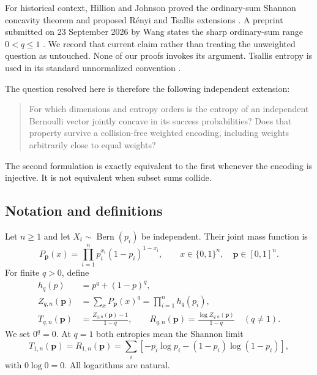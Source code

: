 \documentclass[11pt]{article}
\numberwithin{equation}{section}
\theoremstyle{definition}
\theoremstyle{remark}
\newcommand{\Bern}{\operatorname{Bern}}
\newcommand{\p}{\boldsymbol p}
\newcommand{\Tq}{T_{q,n}}
\newcommand{\Rq}{R_{q,n}}
\newcommand{\Zq}{Z_{q,n}}
\begin{document}
For historical context, Hillion and Johnson proved the ordinary-sum
Shannon concavity theorem and proposed R\'enyi and Tsallis extensions
\cite{HJ2017}. A preprint submitted on 23 September 2026 by Wang states the
sharp ordinary-sum range $0<q\leq1$ \cite{bep:pe:Wang}. We record that current
claim rather than treating the unweighted question as untouched. None of
our proofs invokes its argument. Tsallis entropy is used in its standard
unnormalized convention \cite{bep:pe:Tsallis}.


The question resolved here is therefore the following independent
extension:
\begin{quote}
For which dimensions and entropy orders is the entropy of an independent
Bernoulli vector jointly concave in its success probabilities? Does that
property survive a collision-free weighted encoding, including weights
arbitrarily close to equal weights?
\end{quote}
The second formulation is exactly equivalent to the first whenever the
encoding is injective. It is not equivalent when subset sums collide.

\subsection{Notation and definitions}
Let $n\geq1$ and let $X_i\sim\Bern(p_i)$ be independent. Their joint mass
function is
\begin{equation}
 P_{\p}(x)=\prod_{i=1}^n p_i^{x_i}(1-p_i)^{1-x_i},
 \qquad x\in\{0,1\}^n,\quad\p\in[0,1]^n.
\end{equation}
For finite $q>0$, define
\begin{align}
 h_q(p)&=p^q+(1-p)^q,\\
 \Zq(\p)&=\sum_xP_{\p}(x)^q=\prod_{i=1}^n h_q(p_i),\label{bep:pe:eq:factor}\\
 \Tq(\p)&=\frac{\Zq(\p)-1}{1-q},\qquad
 \Rq(\p)=\frac{\log\Zq(\p)}{1-q}\quad(q\ne1).\label{bep:pe:eq:entropies}
\end{align}
We set $0^q=0$. At $q=1$ both entropies mean the Shannon limit
\begin{equation}
 T_{1,n}(\p)=R_{1,n}(\p)
 =\sum_i[-p_i\log p_i-(1-p_i)\log(1-p_i)],
\end{equation}
with $0\log0=0$. All logarithms are natural.
\end{document}
